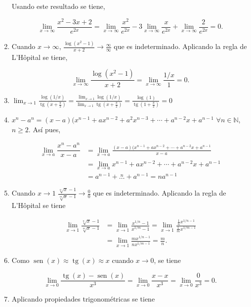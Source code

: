 \documentclass[
  a4paper,
]{scrreport}
\theoremstyle{definition}
\theoremstyle{remark}
\begin{document}
\begin{tcolorbox}
\begin{enumerate}
  Usando este resultado se tiene,

  \[\lim_{x\to\infty}\dfrac{x^2-3x+2}{e^{2x}} = \lim_{x\to\infty}\dfrac{x^2}{e^{2x}}-3\lim_{x\to\infty} \frac{x}{e^{2x}} + \lim_{x\to\infty} \frac{2}{e^{2x}} = 0.
   \]
\item
  Cuando \(x\to\infty\),
  \(\frac{\log(x^2-1)}{x+2}\to \frac{\infty}{\infty}\) que es
  indeterminado. Aplicando la regla de L'Hôpital se tiene,

  \[
   \lim_{x\to\infty}\dfrac{\log(x^2-1)}{x+2} =\lim_{x\to\infty}\frac{1/x}{1} =0.
   \]
\item
  \(\displaystyle \lim_{x\to 1}\frac{\log(1/x)}{\operatorname{tg}(x+\frac{\pi}{2})} = \frac{\lim_{x\to 1}\log(1/x)}{\lim_{x\to 1}\operatorname{tg}(x+\frac{\pi}{2})} = \frac{\log(1)}{\operatorname{tg}(1+\frac{\pi}{2})}=0\)
\item
  \(x^n-a^n = (x-a)(x^{n-1}+ax^{n-2}+a^2x^{n-3}+\cdots + a^{n-2}x+a^{n-1}\)
  \(\forall n\in\mathbb{N}\), \(n\geq 2\). Así pues,

  \begin{align*}
   \lim_{x\to a}\dfrac{x^n-a^n}{x-a} &= \lim_{x\to a}\frac{(x-a)(x^{n-1}+ax^{n-2}+\cdots + a^{n-2}x+a^{n-1}}{x-a} \\ 
   &= \lim_{x\to a} x^{n-1}+ax^{n-2}+\cdots + a^{n-2}x+a^{n-1}\\  
   &= a^{n-1}+\stackrel{n}{\dots}+a^{n-1} = na^{n-1}
   \end{align*}
\item
  Cuando \(x\to 1\)
  \(\frac{\sqrt[n]{x}-1}{\sqrt[m]{x}-1}\to \frac{0}{0}\) que es
  indeterminado. Aplicando la regla de L'Hôpital se tiene

  \begin{align*}
   \lim_{x\to 1}\frac{\sqrt[n]{x}-1}{\sqrt[m]{x}-1} &= \lim_{x\to 1}\frac{x^{1/n}-1}{x^{1/m}-1} = \lim_{x\to 1}\frac{\frac{1}{n}x^{1/n-1}}{\frac{1}{m}x^{1/m-1}}\\  
   &= \lim_{x\to 1}\frac{mx^{1/n-1}}{nx^{1/m-1}} = \frac{m}{n}.
   \end{align*}
\item
  Como \(\operatorname{sen}(x)\approx\operatorname{tg}(x)\approx x\)
  cuando \(x\to 0\), se tiene

  \[
   \lim_{x\to 0}\frac{\operatorname{tg}(x)-\operatorname{sen}(x)}{x^3} = \lim_{x\to 0}\frac{x-x}{x^3} = \lim_{x\to 0}\frac{0}{x^3} = 0.
   \]
\item
  Aplicando propiedades trigonométricas se tiene


\end{enumerate}
\end{tcolorbox}
\end{document}
